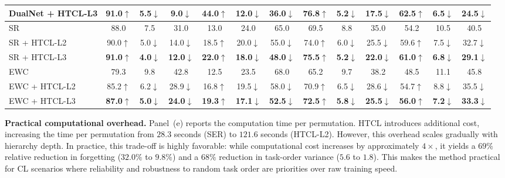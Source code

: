 \begin{table}[!htbp]
{\begin{tabular}{lcccccccccccc}
DualNet + HTCL-L3 &
  \textbf{91.0}$\uparrow$ & \textbf{5.5}$\downarrow$ & \textbf{9.0}$\downarrow$ &
  \textbf{44.0}$\uparrow$ & \textbf{12.0}$\downarrow$ & \textbf{36.0}$\downarrow$ &
  \textbf{76.8}$\uparrow$ & \textbf{5.2}$\downarrow$ & \textbf{17.5}$\downarrow$ &
  \textbf{62.5}$\uparrow$ & \textbf{6.5}$\downarrow$ & \textbf{24.5}$\downarrow$ \\ \hline
SR &
  88.0 & 7.5 & 31.0 &
  13.0 & 24.0 & 65.0 &
  69.5 & 8.8 & 35.0 &
  54.2 & 10.5 & 40.5 \\
SR + HTCL-L2 &
  90.0$\uparrow$ & 5.0$\downarrow$ & 14.0$\downarrow$ &
  18.5$\uparrow$ & 20.0$\downarrow$ & 55.0$\downarrow$ &
  74.0$\uparrow$ & 6.0$\downarrow$ & 25.5$\downarrow$ &
  59.6$\uparrow$ & 7.5$\downarrow$ & 32.7$\downarrow$ \\
SR + HTCL-L3 &
  \textbf{91.0}$\uparrow$ & \textbf{4.0}$\downarrow$ & \textbf{12.0}$\downarrow$ &
  \textbf{22.0}$\uparrow$ & \textbf{18.0}$\downarrow$ & \textbf{48.0}$\downarrow$ &
  \textbf{75.5}$\uparrow$ & \textbf{5.2}$\downarrow$ & \textbf{22.0}$\downarrow$ &
  \textbf{61.0}$\uparrow$ & \textbf{6.8}$\downarrow$ & \textbf{29.1}$\downarrow$ \\ \hline
EWC &
  79.3 & 9.8 & 42.8 &
  12.5 & 23.5 & 68.0 &
  65.2 & 9.7 & 38.2 &
  48.5 & 11.1 & 45.8 \\
EWC + HTCL-L2 &
  85.2$\uparrow$ & 6.2$\downarrow$ & 28.9$\downarrow$ &
  16.8$\uparrow$ & 19.5$\downarrow$ & 58.0$\downarrow$ &
  70.9$\uparrow$ & 6.5$\downarrow$ & 28.6$\downarrow$ &
  54.7$\uparrow$ & 8.8$\downarrow$ & 35.5$\downarrow$ \\
EWC + HTCL-L3 &
  \textbf{87.0}$\uparrow$ & \textbf{5.0}$\downarrow$ & \textbf{24.0}$\downarrow$ &
  \textbf{19.3}$\uparrow$ & \textbf{17.1}$\downarrow$ & \textbf{52.5}$\downarrow$ &
  \textbf{72.5}$\uparrow$ & \textbf{5.8}$\downarrow$ & \textbf{25.5}$\downarrow$ &
  \textbf{56.0}$\uparrow$ & \textbf{7.2}$\downarrow$ & \textbf{33.3}$\downarrow$ \\ \hline
\end{tabular}%
}
\end{table}

\textbf{Practical computational overhead.} Panel~(e) reports the computation time per permutation. HTCL introduces additional cost, increasing the time per permutation from $28.3$ seconds (SER) to $121.6$ seconds (HTCL-L2). However, this overhead scales gradually with hierarchy depth. In practice, this trade-off is highly favorable: while computational cost increases by approximately $4\times$, it yields a $69\%$ relative reduction in forgetting ($32.0\%$ to $9.8\%$) and a $68\%$ reduction in task-order variance ($5.6$ to $1.8$). This makes the method practical for CL scenarios where reliability and robustness to random task order are priorities over raw training speed.

